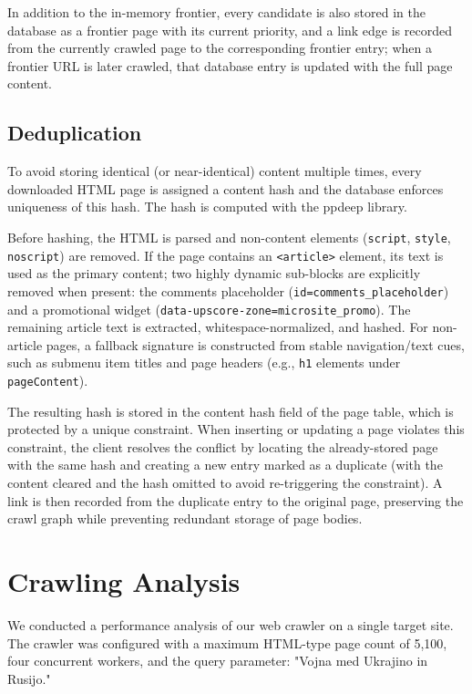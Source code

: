\documentclass[conference]{IEEEtran}
\begin{document}
In addition to the in-memory frontier, every candidate is also stored in the database as a 
frontier page with its current priority, and a link edge is recorded from the currently 
crawled page to the corresponding frontier entry; when a frontier URL is later crawled, that database 
entry is updated with the full page content.

\subsection{Deduplication}
To avoid storing identical (or near-identical) content multiple times, every downloaded HTML page is 
assigned a content hash and the database enforces uniqueness of this hash. The hash is computed with the ppdeep\cite{ppdeep} library.

Before hashing, the HTML is parsed and non-content elements (\texttt{script}, \texttt{style}, \texttt{noscript}) are removed. If the page contains an \texttt{<article>} element, its text is used as the primary content; two highly dynamic sub-blocks are explicitly removed when present: the comments placeholder (\texttt{id=comments\_placeholder}) and a promotional widget (\texttt{data-upscore-zone=microsite\_promo}). The remaining article text is extracted, whitespace-normalized, and hashed. For non-article pages, a fallback signature is constructed from stable navigation/text cues, such as submenu item titles and page headers (e.g., \texttt{h1} elements under \texttt{pageContent}).

The resulting hash is stored in the content hash field of the page table, which is protected by a unique constraint. When inserting or updating a page violates this constraint, the client resolves the conflict by locating the already-stored page with the same hash and creating a new entry marked as a duplicate (with the content cleared and the hash omitted to avoid re-triggering the constraint). A link is then recorded from the duplicate entry to the original page, preserving the crawl graph while preventing redundant storage of page bodies.




\section{Crawling Analysis}

We conducted a performance analysis of our web crawler on a single target site. The crawler was configured with a maximum HTML-type page count of 5,100, four concurrent workers, and the query parameter: "Vojna med Ukrajino in Rusijo." 
\end{document}
